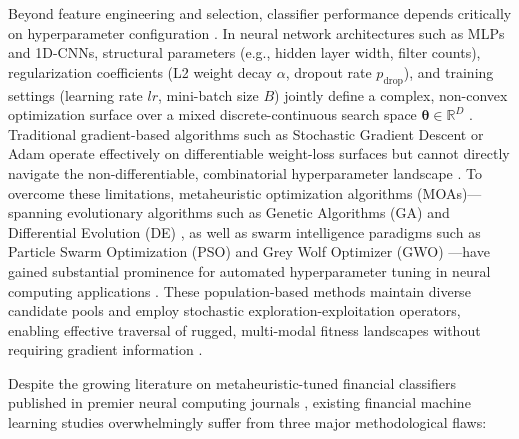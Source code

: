 Beyond feature engineering and selection, classifier performance depends critically on hyperparameter configuration \cite{jovanovic2024wann}. In neural network architectures such as MLPs and 1D-CNNs, structural parameters (e.g., hidden layer width, filter counts), regularization coefficients (L2 weight decay $\alpha$, dropout rate $p_{\text{drop}}$), and training settings (learning rate $lr$, mini-batch size $B$) jointly define a complex, non-convex optimization surface over a mixed discrete-continuous search space $\bm{\theta} \in \mathbb{R}^D$ \cite{jovanovic2024wann, dhingra2025solar}. Traditional gradient-based algorithms such as Stochastic Gradient Descent or Adam operate effectively on differentiable weight-loss surfaces but cannot directly navigate the non-differentiable, combinatorial hyperparameter landscape \cite{faris2018gwo_review, rajwar2023exhaustive_review}. To overcome these limitations, metaheuristic optimization algorithms (MOAs)---spanning evolutionary algorithms such as Genetic Algorithms (GA) \cite{goldberg1989ga} and Differential Evolution (DE) \cite{storn1997de}, as well as swarm intelligence paradigms such as Particle Swarm Optimization (PSO) \cite{kennedy1995pso} and Grey Wolf Optimizer (GWO) \cite{faris2018gwo_review}---have gained substantial prominence for automated hyperparameter tuning in neural computing applications \cite{al_bannoud2026accelerating, bashir2026evobagnet}. These population-based methods maintain diverse candidate pools and employ stochastic exploration-exploitation operators, enabling effective traversal of rugged, multi-modal fitness landscapes without requiring gradient information \cite{faris2018gwo_review}.

Despite the growing literature on metaheuristic-tuned financial classifiers published in premier neural computing journals \cite{dhingra2025solar, al_bannoud2026accelerating, bashir2026evobagnet, bandgar2025finchronos}, existing financial machine learning studies overwhelmingly suffer from three major methodological flaws:

